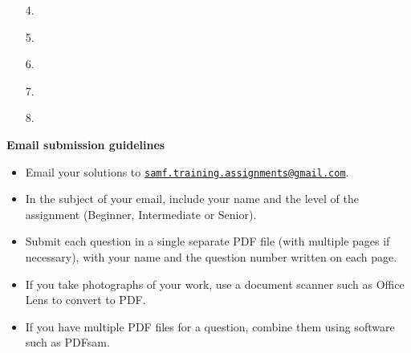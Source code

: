 \documentclass{article}
\begin{document}
\begin{enumerate}
\vspace{6pt}
\item[4.]

\vspace{6pt}
\item[5.]

\vspace{6pt}
\item[6.]

\vspace{6pt}
\item[7.]

\vspace{6pt}
\item[8.]

\end{enumerate}

\vfill
\textbf{\Large Email submission guidelines}
\begin{itemize}
	\item Email your solutions to \href{mailto:samf.training.assignments@gmail.com}{\texttt{samf.training.assignments@gmail.com}}.
	\item In the subject of your email, include your name and the level of the assignment (Beginner, Intermediate or Senior).
	\item Submit each question in a single separate PDF file (with multiple pages if necessary), with your name and the question number written on each page.
	\item If you take photographs of your work, use a document scanner such as Office Lens to convert to PDF.
	\item If you have multiple PDF files for a question, combine them using software such as PDFsam.
\end{itemize}
\end{document}
